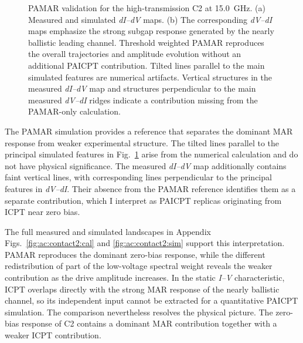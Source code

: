         \begin{figure}[t]
            \centering
            \hfill
            \caption{
                PAMAR validation for the high-transmission C2 at \qty{15.0}{\giga\hertz}. (a) Measured and simulated \textit{dI--dV} maps. (b) The corresponding \textit{dV--dI} maps emphasize the strong subgap response generated by the nearly ballistic leading channel. Threshold weighted PAMAR reproduces the overall trajectories and amplitude evolution without an additional PAICPT contribution. Tilted lines parallel to the main simulated features are numerical artifacts. Vertical structures in the measured \textit{dI--dV} map and structures perpendicular to the main measured \textit{dV--dI} ridges indicate a contribution missing from the PAMAR-only calculation.
            }
            \label{fig:ac:contact2:comparison}
        \end{figure}

        The PAMAR simulation provides a reference that separates the dominant MAR response from weaker experimental structure. The tilted lines parallel to the principal simulated features in Fig.~\ref{fig:ac:contact2:comparison} arise from the numerical calculation and do not have physical significance. The measured \textit{dI--dV} map additionally contains faint vertical lines, with corresponding lines perpendicular to the principal features in \textit{dV--dI}. Their absence from the PAMAR reference identifies them as a separate contribution, which I interpret as PAICPT replicas originating from ICPT near zero bias.

        The full measured and simulated landscapes in Appendix Figs.~\ref{fig:ac:contact2:cal} and \ref{fig:ac:contact2:sim} support this interpretation. PAMAR reproduces the dominant zero-bias response, while the different redistribution of part of the low-voltage spectral weight reveals the weaker contribution as the drive amplitude increases. In the static \textit{I--V} characteristic, ICPT overlaps directly with the strong MAR response of the nearly ballistic channel, so its independent input cannot be extracted for a quantitative PAICPT simulation. The comparison nevertheless resolves the physical picture. The zero-bias response of C2 contains a dominant MAR contribution together with a weaker ICPT contribution.

